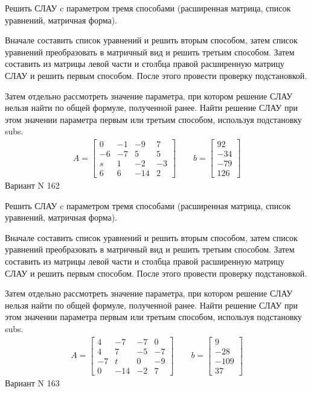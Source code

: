 \documentclass[11pt]{report}
\begin{document}
Решить СЛАУ c параметром тремя способами (расширенная матрица, список уравнений, матричная форма).

Вначале составить список уравнений и решить вторым способом,
затем список уравнений преобразовать в матричный вид и решить третьим способом.
Затем составить из матрицы левой части и столбца правой расширенную матрицу СЛАУ и решить первым способом.
После этого провести проверку подстановкой.

Затем отдельно рассмотреть значение параметра, при котором решение СЛАУ нельзя найти по общей формуле,
полученной ранее.
Найти решение СЛАУ при этом значении параметра первым или третьим способом, используя подстановку subs.
\begin{align*}
    A = \left[\begin{matrix}0 & -1 & -9 & 7\\-6 & -7 & 5 & 5\\s & 1 & -2 & -3\\6 & 6 & -14 & 2\end{matrix}\right]
\qquad b = \left[\begin{matrix}92\\-34\\-79\\126\end{matrix}\right]
\end{align*}
\newpage
Вариант N 162


Решить СЛАУ c параметром тремя способами (расширенная матрица, список уравнений, матричная форма).

Вначале составить список уравнений и решить вторым способом,
затем список уравнений преобразовать в матричный вид и решить третьим способом.
Затем составить из матрицы левой части и столбца правой расширенную матрицу СЛАУ и решить первым способом.
После этого провести проверку подстановкой.

Затем отдельно рассмотреть значение параметра, при котором решение СЛАУ нельзя найти по общей формуле,
полученной ранее.
Найти решение СЛАУ при этом значении параметра первым или третьим способом, используя подстановку subs.
\begin{align*}
    A = \left[\begin{matrix}4 & -7 & -7 & 0\\4 & 7 & -5 & -7\\-7 & t & 0 & -9\\0 & -14 & -2 & 7\end{matrix}\right]
\qquad b = \left[\begin{matrix}9\\-28\\-109\\37\end{matrix}\right]
\end{align*}
\newpage
Вариант N 163
\end{document}
